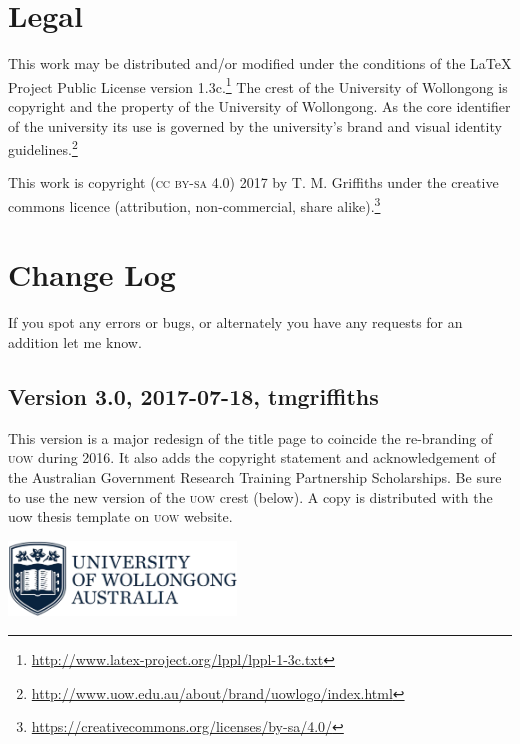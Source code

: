 \documentclass[12pt,oneside]{article}
\begin{document}
\section{Legal}
This work may be distributed and/or modified under the conditions of the \LaTeX{} Project Public License version 1.3c.\footnote{\url{http://www.latex-project.org/lppl/lppl-1-3c.txt}} The crest of the University of Wollongong is copyright and the property of the University of Wollongong. As the core identifier of the university its use is governed by the university's brand and visual identity guidelines.\footnote{\url{http://www.uow.edu.au/about/brand/uowlogo/index.html}}

This work is copyright (\textsc{cc by-sa 4.0}) 2017 by T. M. Griffiths under the creative commons licence (attribution, non-commercial, share alike).\footnote{\url{https://creativecommons.org/licenses/by-sa/4.0/}}

\begin{center}\color{UOWdarkblue}\ccbysa\end{center}

\clearpage

\section{Change Log}
If you spot any errors or bugs, or alternately you have any requests for an addition let me know.

\subsection*{Version 3.0, 2017-07-18, tmgriffiths}
This version is a major redesign of the title page to coincide the re-branding of \textsc{uow} during 2016. It also adds the copyright statement and acknowledgement of the Australian Government Research Training Partnership Scholarships. Be sure to use the new version of the \textsc{uow} crest (below). A copy is distributed with the uow thesis template on \textsc{uow} website.
\begin{center}
  \includegraphics[height=20mm]{uow_logo.png}
\end{center}
\end{document}
